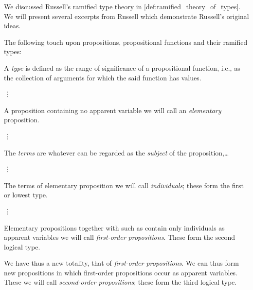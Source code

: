 \begin{remark}\label{rem:hol_formula_order_origin}
  We discussed Russell's ramified type theory in \cref{def:ramified_theory_of_types}. We will present several excerpts from Russell \cite{Russell1908TypeTheory} which demonstrate Russell's original ideas.

  \begin{thmenum}
     The following touch upon propositions, propositional functions and their ramified types:
    \begin{displayquote}
      A \textit{type} is defined as the range of significance of a propositional function, i.e., as the collection of arguments for which the said function has values.

      \begin{center}
        \vdots
      \end{center}

      A proposition containing no apparent variable we will call an \textit{elementary} proposition.

      \begin{center}
        \vdots
      \end{center}

      The \textit{terms} are whatever can be regarded as the \textit{subject} of the proposition,\ldots

      \begin{center}
        \vdots
      \end{center}

      The terms of elementary proposition we will call \textit{individuals}; these form the first or lowest type.

      \begin{center}
        \vdots
      \end{center}

      Elementary propositions together with such as contain only individuals as apparent variables we will call \textit{first-order propositions}. These form the second logical type.

      We have thus a new totality, that of \textit{first-order propositions}. We can thus form new propositions in which first-order propositions occur as apparent variables. These we will call \textit{second-order propositions}; these form the third logical type.


\end{displayquote}
\end{thmenum}
\end{remark}
